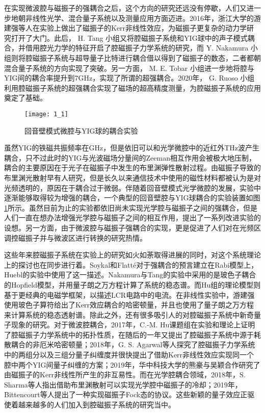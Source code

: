 在实现微波腔与磁振子的强耦合之后，这个方向的研究还远没有停歇，人们又进一步地朝非线性光学、混合量子系统以及测量应用方面迈进。2016年，浙江大学的游建强等人在实验上做出了磁振子的Kerr非线性效应\cite{PhysRevB.94.224410You}，为磁振子更复杂的动力学研究打开了大门。此后， H. Tang 小组又将腔磁振子系统和YIG球中的声子模式耦合\cite{10.1126/sciadv.1501286Tang}，并借用腔光力学的特征开启了腔磁振子力学系统的研究，而 Y. Nakamura 小组则将腔磁振子系统与超导量子比特进行耦合借以得到了磁振子的数态\cite{10.1126/sciadv.1603150Nakamura}，二者都朝混合量子系统的方向实现了突破。另一方面， M. E. Tobar 小组进一步地将腔与YIG间的耦合率提升到7GHz，实现了所谓的超强耦合\cite{PhysRevB.93.144420Tobar}。2020年， G. Ruoso 小组利用腔磁振子系统的超强耦合实现了磁场的超高精度测量\cite{10.1063/5.0024369Ruoso}，为腔磁振子系统的应用奠定了基础。

\begin{figure}[htbp]
	\centering
	\texttt{[image: 1\_1]}
	\caption{回音壁模式微腔与YIG球的耦合实验\cite{PhysRevLett.116.223601Nakamura}} 
	\label{FigOpticalCavity}
\end{figure}
虽然YIG的铁磁共振频率在GHz，但是依旧可以和光学微腔中的近红外THz波产生耦合，只不过此时的YIG与光波磁场分量间的Zeeman相互作用会被极大地压制，耦合的主要原因在于光子在磁振子中发生的布里渊弹性散射过程。由磁振子导致的布里渊光散射早有人研究，但是长久以来通信技术中使用的磁性材料都被认为是对光频透明的，原因在于耦合过于微弱。伴随着回音壁模式光学微腔的发展，实验中逐渐能够取得较为增强的耦合，一个典型的回音壁腔与YIG球耦合的实验装置如图\ref{FigOpticalCavity}所示。虽然目前为止的实验都依旧尚未实现光学腔与磁振子之间的强耦合，但是人们一直在想办法增强光学腔与磁振子之间的相互作用，提出了一系列改进实验的设想\cite{Pantazopoulos_2018,PhysRevB.98.241406Graf,PhysRevResearch.3.013277Graf}。另一方面，由于微波腔与磁振子强耦合的实现，更是促进了人们对在光频区调控磁振子并与微波区进行转换的研究热情。

这些年来腔磁振子系统在实验上的研究如火如荼取得进展的同时，对这个系统理论上的探讨也在同步进行着。Soykal和Flatt\'e对于强耦合的预言建立在Rabi模型上，Huebl的实验中使用了这一描述。Nakamura与Tang的实验中采用的是玻色子耦合的Hopfield模型，并用量子朗之万方程计算了系统的稳态谱。而Hu组的理论模型则基于更经典的电磁学框架，以描述LCR电路中的电流。在非线性实验中，游建强使用玻色子算符给出了Kerr效应耦合的哈密顿量，并且也使用了量子朗之万方程来计算系统的稳态透射谱。除此之外，还有很多吸引人的对腔磁振子系统中新奇量子现象的研究。对于微波腔耦合，2017年，C.-M. Hu课题组在实验和理论上证明了腔磁振子力学系统中的拓扑性质\cite{PhysRevB.95.214411Hu}，在随后的一年又提出了腔磁振子系统中源于耗散耦合的非厄米哈密顿量\cite{PhysRevLett.121.137203Hu}；2018年，G. S. Agarwal等人探究了腔磁振子力学系统中的两组分以及三组分量子纠缠度并很快提出了借助Kerr非线性效应实现同一个腔中两个YIG间量子纠缠的方案\cite{PhysRevLett.121.203601Agarwal}；2019年，华中科技大学的熊豪与吴颖合作研究了由磁振子的Kerr非线性所产生的非互易性\cite{PhysRevApplied.12.034001Xiong}。而在光学腔耦合领域，2018年，S. Sharma等人指出借助布里渊散射可以实现光学腔中磁振子的冷却\cite{PhysRevLett.121.087205Sharma}；2019年，Bittencourt等人提出了一种实现磁振子Fock态的协议\cite{PhysRevA.100.013810Bittencourt}。这些新颖的量子效应正驱使着越来越多的人们加入到腔磁振子系统的研究当中。

